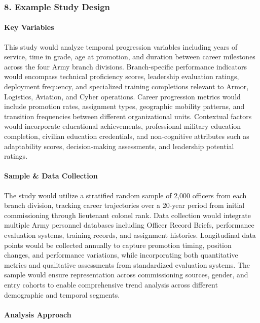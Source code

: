 \documentclass[./main.tex]{subfiles}
\begin{document}
\subsubsection{8. Example Study Design}\label{example-study-design}

\paragraph{Key Variables}\label{key-variables}

This study would analyze temporal progression variables including years
of service, time in grade, age at promotion, and duration between career
milestones across the four Army branch divisions. Branch-specific
performance indicators would encompass technical proficiency scores,
leadership evaluation ratings, deployment frequency, and specialized
training completions relevant to Armor, Logistics, Aviation, and Cyber
operations. Career progression metrics would include promotion rates,
assignment types, geographic mobility patterns, and transition
frequencies between different organizational units. Contextual factors
would incorporate educational achievements, professional military
education completion, civilian education credentials, and non-cognitive
attributes such as adaptability scores, decision-making assessments, and
leadership potential ratings.

\paragraph{Sample \& Data Collection}\label{sample-data-collection}

The study would utilize a stratified random sample of 2,000 officers
from each branch division, tracking career trajectories over a 20-year
period from initial commissioning through lieutenant colonel rank. Data
collection would integrate multiple Army personnel databases including
Officer Record Briefs, performance evaluation systems, training records,
and assignment histories. Longitudinal data points would be collected
annually to capture promotion timing, position changes, and performance
variations, while incorporating both quantitative metrics and
qualitative assessments from standardized evaluation systems. The sample
would ensure representation across commissioning sources, gender, and
entry cohorts to enable comprehensive trend analysis across different
demographic and temporal segments.

\paragraph{Analysis Approach}\label{analysis-approach}
\end{document}
